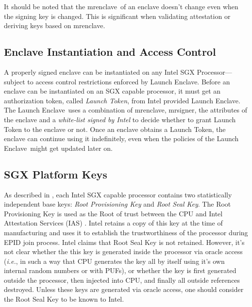 \documentclass[10pt, letterpaper]{article}
\newcommand{\ie}{\textit{i.e.}}
\newcommand{\mrenclave}{\textsf{mrenclave}}
\newcommand{\mrsigner}{\textsf{mrsigner}}
\newcommand{\launchenclave}{\textsf{Launch Enclave}}
\begin{document}
  It should be noted that the \mrenclave\ of an enclave doesn't change
  even when the signing key is changed. This is significant when
  validating attestation or deriving keys based on \mrenclave.

  \subsection{Enclave Instantiation and Access Control}

  A properly signed enclave can be instantiated on any Intel SGX
  Processor---subject to access control restrictions enforced by
  \launchenclave. Before an enclave can be instantiated on an SGX
  capable processor, it must get an authorization token, called
  \textit{Launch Token}, from Intel provided \launchenclave. The
  \launchenclave\ uses a combination of \mrenclave, \mrsigner, the
  attributes of the enclave and a \textit{white-list signed by Intel}
  to decide whether to grant Launch Token to the enclave or not. Once
  an enclave obtains a Launch Token, the enclave can continue using it
  indefinitely, even when the policies of the \launchenclave\ might
  get updated later on.

  \subsection{SGX Platform Keys}
  \label{ssec:platkeys}

  As described in \cite{sgxattest}, each Intel SGX capable processor
  contains two statistically independent base keys: \textit{Root
    Provisioning Key} and \textit{Root Seal Key}. The Root
  Provisioning Key is used as the Root of trust between the CPU and
  Intel Attestation Services (IAS) \cite{ias}. Intel retains a copy of
  this key at the time of manufacturing and uses it to establish the
  trustworthiness of the processor during EPID join process. Intel
  claims that Root Seal Key is not retained. However, it's not clear
  whether the this key is generated inside the processor via oracle
  access (\ie, in such a way that CPU generates the key all by itself
  using it's own internal random numbers or with PUFs), or whether the
  key is first generated outside the processor, then injected into
  CPU, and finally all outside references destroyed. Unless these keys
  are generated via oracle access, one should consider the Root Seal
  Key to be known to Intel.
\end{document}
